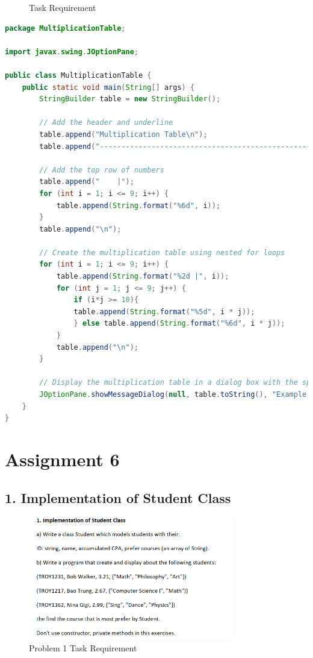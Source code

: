 \documentclass{article}
\begin{document}
\begin{figure}[h]
    \centering
    \caption{Task Requirement}
\end{figure}

\begin{lstlisting}[language=Java, caption=MultiplicationTable.java]
package MultiplicationTable;

import javax.swing.JOptionPane;

public class MultiplicationTable {
    public static void main(String[] args) {
        StringBuilder table = new StringBuilder();

        // Add the header and underline
        table.append("Multiplication Table\n");
        table.append("-------------------------------------------------------\n");

        // Add the top row of numbers
        table.append("    |");
        for (int i = 1; i <= 9; i++) {
            table.append(String.format("%6d", i));
        }
        table.append("\n");

        // Create the multiplication table using nested for loops
        for (int i = 1; i <= 9; i++) {
            table.append(String.format("%2d |", i));
            for (int j = 1; j <= 9; j++) {
                if (i*j >= 10){
                table.append(String.format("%5d", i * j));
                } else table.append(String.format("%6d", i * j));
            }
            table.append("\n");
        }

        // Display the multiplication table in a dialog box with the specified header
        JOptionPane.showMessageDialog(null, table.toString(), "Example 3.4 Output", JOptionPane.INFORMATION_MESSAGE);
    }
}
\end{lstlisting}

\section*{Assignment 6}

\subsection*{1. Implementation of Student Class}
\begin{figure}[H]
    \centering
    \includegraphics[width=0.8\textwidth]{./Assets/Task requirements/Assignment6/1.png}
    
    \caption{Problem 1 Task Requirement}
\end{figure}
\end{document}
